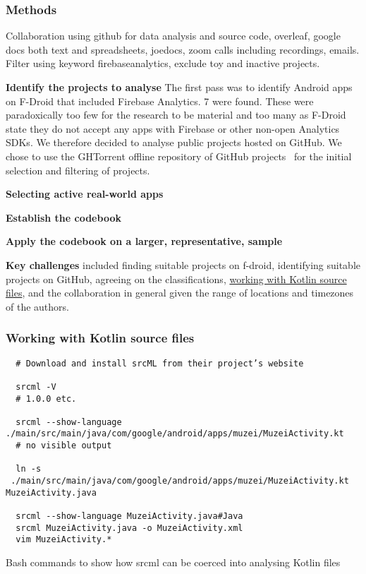 \subsubsection{Methods} 
Collaboration using github for data analysis and source code, overleaf, google docs both text and spreadsheets, joedocs, zoom calls including recordings, emails. Filter using keyword firebaseanalytics, exclude toy and inactive projects. 

\textbf{Identify the projects to analyse}
The first pass was to identify Android apps on F-Droid that included Firebase Analytics. 7 were found. These were paradoxically too few for the research to be material and too many as F-Droid state they do not accept any apps with Firebase or other non-open Analytics SDKs. We therefore decided to analyse public projects hosted on GitHub. We chose to use the GHTorrent offline repository of GitHub projects~\citep{gousios2012_ghtorrent_githubs_data_from_a_firehose} for the initial selection and filtering of projects. 

\textbf{Selecting active real-world apps}

\textbf{Establish the codebook}

\textbf{Apply the codebook on a larger, representative, sample}


\textbf{Key challenges} included finding suitable projects on f-droid, identifying suitable projects on GitHub, agreeing on the classifications, \href{subsection_srcml_working_with_kotlin_files}{working with Kotlin source files}, and the collaboration in general given the range of locations and timezones of the authors. 

\subsubsection{Working with Kotlin source files}
\label{subsection_srcml_working_with_kotlin_files}

\begin{listing}
\begin{verbatim}
  # Download and install srcML from their project’s website

  srcml -V
  # 1.0.0 etc.

  srcml --show-language ./main/src/main/java/com/google/android/apps/muzei/MuzeiActivity.kt
  # no visible output

  ln -s  ./main/src/main/java/com/google/android/apps/muzei/MuzeiActivity.kt MuzeiActivity.java

  srcml --show-language MuzeiActivity.java#Java
  srcml MuzeiActivity.java -o MuzeiActivity.xml
  vim MuzeiActivity.*
\end{verbatim}
\caption{Bash commands to show how srcml can be coerced into analysing Kotlin files}
\label{listing:bash_example_srcml_does_kotlin}
\end{listing}

